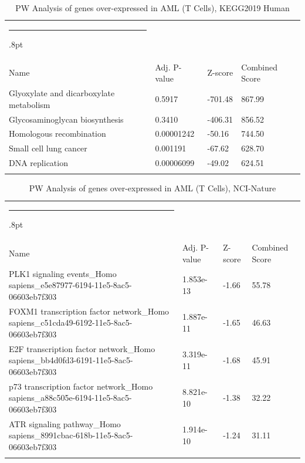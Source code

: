 \documentclass[3p,authoryear,preprint,12pt]{elsarticle}
\makeatletter
\def\hlinewd#1{%
  \noalign{\ifnum0=`}\fi\hrule \@height #1%
  \futurelet\reserved@a\@xhline}
\def\tbltoprule{\hlinewd{.8pt}\\[-12pt]}
\def\tblbottomrule{\noalign{\vspace*{6pt}}\hline\noalign{\vspace*{2pt}}}
\def\tblmidrule{\noalign{\vspace*{6pt}}\hline\noalign{\vspace*{2pt}}}
\makeatother
\begin{document}
\begin{table}[!htbp]
	\caption{{PW Analysis of genes over-expressed in AML (T Cells), KEGG2019 Human} }
	\label{tw-de478ae31cu6}
	\def\arraystretch{1}
	\ignorespaces 
	\centering 
	\begin{tabulary}{\linewidth}{p{\dimexpr.65\tabcolsep}p{\dimexpr.15\tabcolsep}p{\dimexpr.1\tabcolsep}p{\dimexpr.1\tabcolsep}}
		\tbltoprule Name & Adj. P-value & Z-score & Combined Score\\
		\tblmidrule
Glyoxylate and dicarboxylate metabolism & 0.5917 & -701.48 & 867.99 \\
Glycosaminoglycan biosynthesis & 0.3410 & -406.31 & 856.52 \\
Homologous recombination & 0.00001242 & -50.16 & 744.50 \\
Small cell lung cancer & 0.001191 & -67.62 & 628.70 \\
DNA replication & 0.00006099 & -49.02 & 624.51 \\
		\tblbottomrule
	\end{tabulary}\par 
\end{table}
\begin{table}[!htbp]
	\caption{{PW Analysis of genes over-expressed in AML (T Cells), NCI-Nature} }
	\label{tw-de478ae31cv6}
	\def\arraystretch{1}
	\ignorespaces 
	\centering 
	\begin{tabulary}{\linewidth}{p{\dimexpr.65\tabcolsep}p{\dimexpr.15\tabcolsep}p{\dimexpr.1\tabcolsep}p{\dimexpr.1\tabcolsep}}
		\tbltoprule Name & Adj. P-value & Z-score & Combined Score\\
		\tblmidrule
PLK1 signaling events\_Homo sapiens\_e5e87977-6194-11e5-8ac5-06603eb7f303 & 1.853e-13 & -1.66 & 55.78 \\
FOXM1 transcription factor network\_Homo sapiens\_c51cda49-6192-11e5-8ac5-06603eb7f303 & 1.887e-11 & -1.65 & 46.63 \\
E2F transcription factor network\_Homo sapiens\_bb4d0fd3-6191-11e5-8ac5-06603eb7f303 & 3.319e-11 & -1.68 & 45.91 \\
p73 transcription factor network\_Homo sapiens\_a88c505e-6194-11e5-8ac5-06603eb7f303 & 8.821e-10 & -1.38 & 32.22 \\
ATR signaling pathway\_Homo sapiens\_8991cbac-618b-11e5-8ac5-06603eb7f303 & 1.914e-10 & -1.24 & 31.11 \\
		\tblbottomrule
	\end{tabulary}\par 
\end{table}
\end{document}
